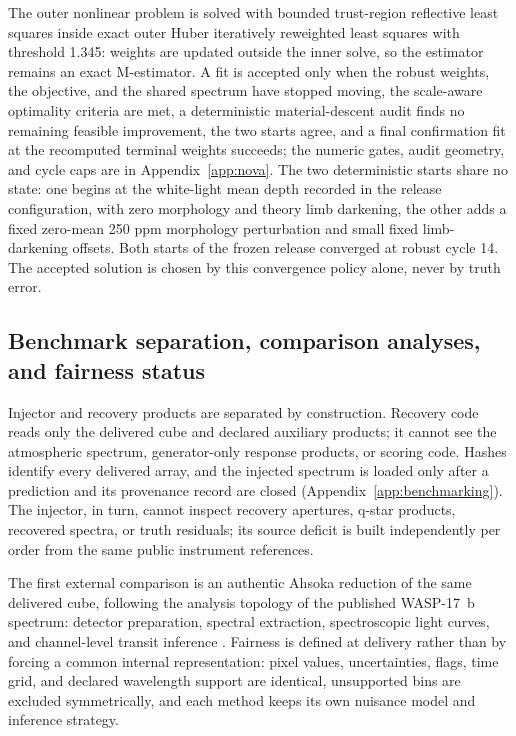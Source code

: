 The outer nonlinear problem is solved with bounded trust-region reflective
least squares \citep{BranchColemanLi1999} inside exact outer Huber
iteratively reweighted least squares \citep{Huber1964} with threshold
1.345: weights are updated outside the inner solve, so the estimator
remains an exact M-estimator. A fit is accepted only when the robust
weights, the objective, and the shared spectrum have stopped moving, the
scale-aware optimality criteria are met, a deterministic material-descent
audit finds no remaining feasible improvement, the two starts agree, and a
final confirmation fit at the recomputed terminal weights succeeds; the
numeric gates, audit geometry, and cycle caps are in
Appendix~\ref{app:nova}. The two deterministic starts share no state: one
begins at the white-light mean depth recorded in the release
configuration, with zero morphology and theory limb darkening, the other adds a fixed zero-mean 250 ppm morphology
perturbation and small fixed limb-darkening offsets. Both starts of the
frozen release converged at robust cycle 14. The accepted solution is
chosen by this convergence policy alone, never by truth error.

\subsection{Benchmark separation, comparison analyses, and fairness status}


Injector and recovery products are separated by construction. Recovery
code reads only the delivered cube and declared auxiliary products; it
cannot see the atmospheric spectrum, generator-only response products, or
scoring code. Hashes identify every delivered array, and the injected
spectrum is loaded only after a prediction and its provenance record are
closed (Appendix~\ref{app:benchmarking}). The injector, in turn, cannot
inspect recovery apertures, q-star products, recovered spectra, or truth
residuals; its source deficit is built independently per order from the
same public instrument references.

The first external comparison is an authentic Ahsoka reduction of the same
delivered cube, following the analysis topology of the published
WASP-17~b spectrum: detector preparation, spectral extraction,
spectroscopic light curves, and channel-level transit inference
\citep{LouieEtAl2025}. Fairness is defined at delivery rather than by
forcing a common internal representation: pixel values, uncertainties,
flags, time grid, and declared wavelength support are identical,
unsupported bins are excluded symmetrically, and each method keeps its own
nuisance model and inference strategy.

